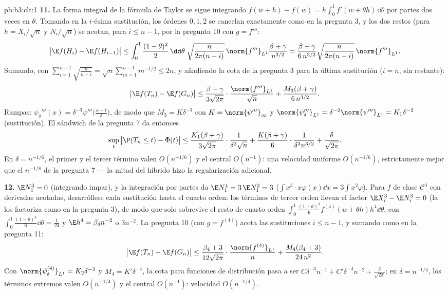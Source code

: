 \begin{solution}{pb:b3:clt:1}
\textbf{11.} La forma integral de la fórmula de Taylor se sigue
integrando $f(w + h) - f(w) =
h\int_0^1f'(w + \theta h)\,\dd\theta$ por partes dos veces en $\theta$.
Tomando  en la $i$-ésima
sustitución, los órdenes $0, 1, 2$ se cancelan exactamente como en la
pregunta 3, y los dos restos (para $h = X_i/\sqrt n$ y $N_i/\sqrt n$) se
acotan, para $i \leq n - 1$, por la pregunta 10 con $g = f'''$:
\[
\bigl|\E f(H_i) - \E f(H_{i-1})\bigr| \leq
\int_0^1\frac{(1-\theta)^2}2\,\dd\theta\;
\sqrt{\frac{n}{2\pi(n-i)}}\,\norm{f'''}_{L^1}
\frac{\beta + \gamma}{n^{3/2}}
= \frac{\beta + \gamma}{6\,n^{3/2}}
\sqrt{\frac{n}{2\pi(n-i)}}\,\norm{f'''}_{L^1} .
\]
Sumando, con $\sum_{i=1}^{n-1}\sqrt{\frac n{n-i}} =
\sqrt n\sum_{m=1}^{n-1}m^{-1/2} \leq 2n$, y añadiendo la cota de la
pregunta 3 para la última sustitución ($i = n$, sin
 restante):
\[
\bigl|\E f(T_n) - \E f(G_n)\bigr| \leq
\frac{\beta + \gamma}{3\sqrt{2\pi}}\cdot
\frac{\norm{f'''}_{L^1}}{\sqrt n} +
\frac{M_3(\beta + \gamma)}{6\,n^{3/2}} .
\]
Rampas: $\psi_\delta'''(x) =
\delta^{-3}\psi'''\bigl(\frac{x - t}\delta\bigr)$, de modo que
$M_3 = K\delta^{-3}$ con $K = \norm{\psi'''}_\infty$ y
$\norm{\psi_\delta'''}_{L^1} = \delta^{-2}
\norm{\psi'''}_{L^1} = K_1\delta^{-2}$ (sustitución). El sándwich de la
pregunta 7 da entonces
\[
\sup_t\,\bigl|\P(T_n \leq t) - \Phi(t)\bigr| \leq
\frac{K_1(\beta + \gamma)}{3\sqrt{2\pi}}\cdot
\frac1{\delta^2\sqrt n} +
\frac{K(\beta + \gamma)}{6}\cdot
\frac1{\delta^3n^{3/2}} + \frac\delta{\sqrt{2\pi}} .
\]
En $\delta = n^{-1/6}$, el primer y el tercer término valen
$O(n^{-1/6})$ y el central $O(n^{-1})$: una velocidad uniforme
$O(n^{-1/6})$, estrictamente mejor que el $n^{-1/8}$ de la pregunta 7
--- la mitad  del híbrido
hizo la regularización adicional.

\textbf{12.} $\E N_1^3 = 0$ (integrando impar), y la integración por
partes da $\E N_1^4 = 3\,\E N_1^2 = 3$
($\int x^3\cdot x\varphi(x)\dd x =
3\int x^2\varphi$). Para $f$ de clase $\mathcal C^4$ con derivadas
acotadas, desarróllese cada sustitución hasta el cuarto orden: los
términos de tercer orden llevan el factor $\E X_i^3 - \E N_i^3 =
0$ (la  los
factoriza como en la pregunta 3), de modo que solo sobrevive el resto de
cuarto orden $\int_0^1\frac{(1-\theta)^3}6f^{(4)}(w + \theta
h)h^4\dd\theta$, con $\int_0^1
\frac{(1-\theta)^3}6\dd\theta = \frac1{24}$ y $\E h^4 =
\beta_4n^{-2}$ o $3n^{-2}$. La pregunta 10 (con $g =
f^{(4)}$) acota las sustituciones $i \leq n - 1$, y sumando como en la
pregunta 11:
\[
\bigl|\E f(T_n) - \E f(G_n)\bigr| \leq
\frac{\beta_4 + 3}{12\sqrt{2\pi}}\cdot
\frac{\norm{f^{(4)}}_{L^1}}{n} +
\frac{M_4(\beta_4 + 3)}{24\,n^2} .
\]
Con $\norm{\psi_\delta^{(4)}}_{L^1} = K_2\delta^{-3}$ y
$M_4 = K'\delta^{-4}$, la cota para funciones de distribución pasa a ser
$C\delta^{-3}n^{-1} + C'\delta^{-4}n^{-2} +
\frac\delta{\sqrt{2\pi}}$; en $\delta = n^{-1/4}$, los términos extremos
valen $O(n^{-1/4})$ y el central $O(n^{-1})$: velocidad $O(n^{-1/4})$.


\end{solution}
